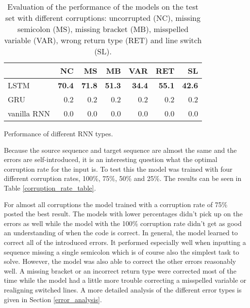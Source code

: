 \begin{table}[t]
\begin{subtable}{\linewidth}
\end{subtable}
\newline
\vspace*{5mm}
\newline
\begin{subtable}{\linewidth}\centering
{\begin{tabular}{ | l | r | r | r | r | r | r | }
  \hline
  & NC & MS & MB & VAR & RET & SL \\
  \hline
  \hline
  LSTM & \textbf{70.4} & \textbf{71.8} & \textbf{51.3} & \textbf{34.4} & \textbf{55.1} & \textbf{42.6} \\
  \hline
  GRU & 0.2 & 0.2 & 0.2 & 0.2 & 0.2 & 0.2 \\
  \hline
  vanilla RNN & 0.0 & 0.0 & 0.0 & 0.0 & 0.0 & 0.0 \\
  \hline
\end{tabular}}
\caption{Performance of different RNN types.}\label{rnn_type_table}
\end{subtable}
\caption{Evaluation of the performance of the models on the test set with different corruptions: uncorrupted (NC), missing semicolon (MS), missing bracket (MB), misspelled variable (VAR), wrong return type (RET) and line switch (SL).}
\end{table}

Because the source sequence and target sequence are almost the same and the errors are self-introduced, it is an interesting question what the optimal corruption rate for the input is. To test this the model was trained with four different corruption rates, 100\%, 75\%, 50\% and 25\%. The results can be seen in Table \ref{corruption_rate_table}.

For almost all corruptions the model trained with a corruption rate of 75\% posted the best result. The models with lower percentages didn't pick up on the errors as well while the model with the 100\% corruption rate didn't get as good an understanding of when the code is correct. In general, the model learned to correct all of the introduced errors. It performed especially well when inputting a sequence missing a single semicolon which is of course also the simplest task to solve. However, the model was also able to correct the other errors reasonably well. A missing bracket or an incorrect return type were corrected most of the time while the model had a little more trouble correcting a misspelled variable or realigning switched lines. A more detailed analysis of the different error types is given in Section \ref{error_analysis}.

